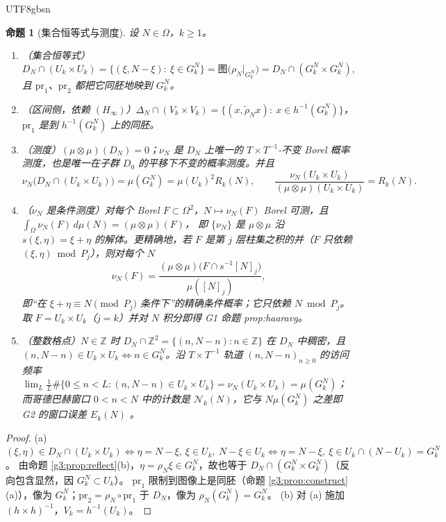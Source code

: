\documentclass[11pt,a4paper]{article}
\newcommand{\Haar}{\mu}
\newcommand{\status}[1]{\par\noindent\fbox{\textbf{状态：#1}}\par\smallskip}
\newcommand{\Cnt}{\mathcal N}          %
\newcommand{\Om}{\Omega}               %
\newcommand{\cyl}[2]{[#1]_{#2}}        %
\newcommand{\pr}{\mathrm{pr}}
\theoremstyle{plain}
\newtheorem{prop}{命题}
\theoremstyle{definition}
\begin{document}
\begin{CJK}{UTF8}{gbsn}
\begin{prop}[集合恒等式与测度]\label{g3:prop:measure}
设 $N\in\Om$，$k\ge1$。
\begin{enumerate}[label=(\alph*)]
\item（集合恒等式）
\[
D_N\cap(U_k\times U_k)=\{(\xi,N-\xi):\ \xi\in G_k^N\}=\text{图}\bigl(\rho_N|_{G_k^N}\bigr)=D_N\cap(G_k^N\times G_k^N),
\]
且 $\pr_1$、$\pr_2$ 都把它同胚地映到 $G_k^N$。
\item（区间侧，依赖 $(H_\infty)$）$\Delta_N\cap(V_k\times V_k)=\{(x,\tilde\rho_Nx):\ x\in h^{-1}(G_k^N)\}$，$\pr_1$ 是到 $h^{-1}(G_k^N)$ 上的同胚。
\item（测度）$(\Haar\otimes\Haar)(D_N)=0$；$\nu_N$ 是 $D_N$ 上唯一的 $T\times T^{-1}$-不变 Borel 概率测度，也是唯一在子群 $D_0$ 的平移下不变的概率测度。并且
\[
\nu_N\bigl(D_N\cap(U_k\times U_k)\bigr)=\Haar(G_k^N)=\Haar(U_k)^2R_k(N),\qquad
\frac{\nu_N(U_k\times U_k)}{(\Haar\otimes\Haar)(U_k\times U_k)}=R_k(N).
\]
\item（$\nu_N$ 是条件测度）对每个 Borel $F\subset\Om^2$，$N\mapsto\nu_N(F)$ Borel 可测，且 $\int_\Om\nu_N(F)\,d\Haar(N)=(\Haar\otimes\Haar)(F)$，
即 $\{\nu_N\}$ 是 $\Haar\otimes\Haar$ 沿 $s(\xi,\eta)=\xi+\eta$ 的解体。更精确地，若 $F$ 是第 $j$ 层柱集之积的并（$F$ 只依赖 $(\xi,\eta)\bmod P_j$），则对\emph{每个} $N$
\[
\nu_N(F)=\frac{(\Haar\otimes\Haar)\bigl(F\cap s^{-1}\cyl Nj\bigr)}{\Haar(\cyl Nj)},
\]
即“在 $\xi+\eta\equiv N\pmod{P_j}$ 条件下”的精确条件概率；它只依赖 $N\bmod P_j$。取 $F=U_k\times U_k$（$j=k$）并对 $N$ 积分即得 G1 命题 prop:haaravg。
\item（整数格点）$N\in\mathbb Z$ 时 $D_N\cap\mathbb Z^2=\{(n,N-n):n\in\mathbb Z\}$ 在 $D_N$ 中稠密，且
$(n,N-n)\in U_k\times U_k\iff n\in G_k^N$。沿 $T\times T^{-1}$ 轨道 $(n,N-n)_{n\ge0}$ 的访问频率
$\lim_L\frac1L\#\{0\le n<L:(n,N-n)\in U_k\times U_k\}=\nu_N(U_k\times U_k)=\Haar(G_k^N)$；
而哥德巴赫窗口 $0<n<N$ 中的计数是 $\Cnt_k(N)$，它与 $N\Haar(G_k^N)$ 之差即 G2 的窗口误差 $E_k(N)$ \cite{G2}。
\end{enumerate}
\end{prop}
\status{已证（(b) 依赖假设 \ref{g3:hyp:infinite}；其余无条件）}
\begin{proof}
(a) $(\xi,\eta)\in D_N\cap(U_k\times U_k)\iff\eta=N-\xi,\ \xi\in U_k,\ N-\xi\in U_k\iff\eta=N-\xi,\ \xi\in U_k\cap(N-U_k)=G_k^N$。
由命题 \ref{g3:prop:reflect}(b)，$\eta=\rho_N\xi\in G_k^N$，故也等于 $D_N\cap(G_k^N\times G_k^N)$（反向包含显然，因 $G_k^N\subset U_k$）。
$\pr_1$ 限制到图像上是同胚（命题 \ref{g3:prop:construct}(a)），像为 $G_k^N$；$\pr_2=\rho_N\circ\pr_1$ 于 $D_N$，像为 $\rho_N(G_k^N)=G_k^N$。
(b) 对 (a) 施加 $(h\times h)^{-1}$，$V_k=h^{-1}(U_k)$。


\end{proof}
\end{CJK}
\end{document}
